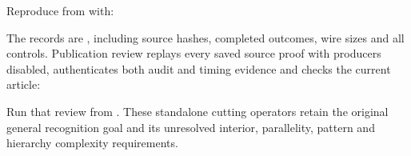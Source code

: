 Reproduce from  with:
\begin{quote}\small
{}
\end{quote}
The records are , including source
hashes, completed outcomes, wire sizes and all controls. Publication review
replays every saved source proof with producers disabled, authenticates both
audit and timing evidence and checks the current article:
\begin{quote}\small
{}
\end{quote}
Run that review from . These standalone cutting operators
retain the original general recognition goal and its unresolved interior,
parallelity, pattern and hierarchy complexity requirements.
